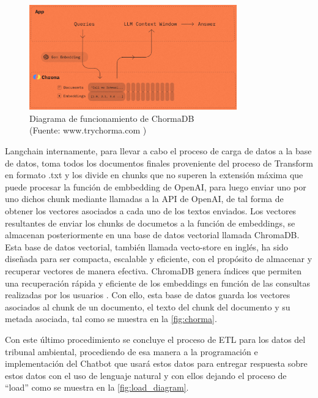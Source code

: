 \begin{figure}[ht!]
    \centering
    \includegraphics[width=0.8\textwidth]{figures/chorma.png}
    \caption[Diagrama de funcionamiento de ChormaDB]{Diagrama de funcionamiento de ChormaDB\\
    {\scriptsize (Fuente: www.trychorma.com \cite{trychromaAInativeOpensource})}}
    \label{fig:chorma}
\end{figure}

\newpage

\par Langchain internamente, para llevar a cabo el proceso de carga de datos a la base de datos, toma todos los documentos finales proveniente del proceso de Transform en formato .txt y los divide en chunks que no superen la extensión máxima que puede procesar la función de embbedding de OpenAI, para luego enviar uno por uno dichos chunk mediante llamadas a la API de OpenAI, de tal forma de obtener los vectores asociados a cada uno de los textos enviados. 
Los vectores resultantes de enviar los chunks de documetos a la función de embeddings, se almacenan posteriormente en una base de datos vectorial llamada ChromaDB. Esta base de 
datos vectorial, también llamada vecto-store en inglés, ha sido diseñada para ser compacta, escalable y eficiente, con el propósito de almacenar y recuperar vectores de manera 
efectiva. ChromaDB genera índices que permiten una recuperación rápida y eficiente de los embeddings en función de las 
consultas realizadas por los usuarios \cite{langchain1}. Con ello, esta base de datos guarda los vectores asociados al chunk de un documento, 
el texto del chunk del documento y su metada asociada, tal como se muestra en la \autoref{fig:chorma}.


\par Con este último procedimiento se concluye el proceso de ETL para los datos del tribunal ambiental, procediendo de esa manera 
a la programación e implementación del Chatbot que usará estos datos para entregar respuesta sobre estos datos con el uso de 
lenguaje natural y con ellos dejando el proceso de ``load'' como se muestra en la \autoref{fig:load_diagram}.\\


